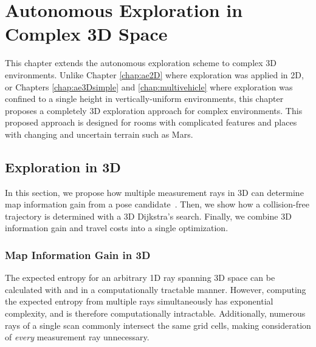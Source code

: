 
\chapter{Autonomous Exploration in Complex 3D Space} \label{chap:ae3Dcomplex}

This chapter extends the autonomous exploration scheme to complex 3D environments. Unlike Chapter \ref{chap:ae2D} where exploration was applied in 2D, or Chapters \ref{chap:ae3Dsimple} and \ref{chap:multivehicle} where exploration was confined to a single height in vertically-uniform environments, this chapter proposes a completely 3D exploration approach for complex environments. This proposed approach is designed for rooms with complicated features and places with changing and uncertain terrain such as Mars.

\section{Exploration in 3D}

In this section, we propose how multiple measurement rays in 3D can determine map information gain from a pose candidate~\cite{KauLee19}. Then, we show how a collision-free trajectory is determined with a 3D Dijkstra's search. Finally, we combine 3D information gain and travel costs into a single optimization.

\subsection{Map Information Gain in 3D}

The expected entropy for an arbitrary 1D ray spanning 3D space can be calculated with  and  in a computationally tractable manner. However, computing the expected entropy from multiple rays simultaneously has exponential complexity, and is therefore computationally intractable. Additionally, numerous rays of a single scan commonly intersect the same grid cells, making consideration of \emph{every} measurement ray unnecessary.

